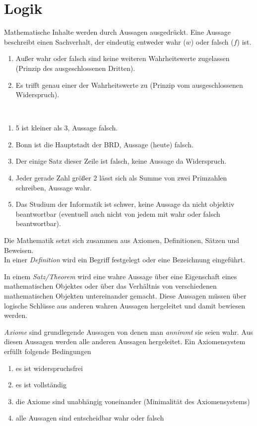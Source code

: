 \section{Logik}
Mathematische Inhalte werden durch Aussagen ausgedrückt. Eine Aussage beschreibt einen Sachverhalt, der eindeutig entweder wahr ($w$) oder falsch ($f$) ist.
\begin{enumerate}
\item Außer wahr oder falsch sind keine weiteren Wahrheitswerte zugelassen (Prinzip des ausgeschlossenen Dritten).
\item Es trifft genau einer der Wahrheitswerte zu (Prinzip vom ausgeschlossenen Widerspruch).
\end{enumerate}

\begin{example}~
\begin{enumerate}
\item 5 ist kleiner als 3, Aussage falsch.
\item Bonn ist die Hauptstadt der BRD, Aussage (heute) falsch.
\item Der einige Satz dieser Zeile ist falsch, keine Aussage da Widerspruch.
\item Jeder gerade Zahl größer 2 lässt sich als Summe von zwei Primzahlen schreiben, Aussage wahr.
\item Das Studium der Informatik ist schwer, keine Aussage da nicht objektiv beantwortbar (eventuell auch nicht von jedem mit wahr oder falsch beantwortbar).
\end{enumerate}
\end{example}

Die Mathematik setzt sich zusammen aus Axiomen, Definitionen, Sätzen und Beweisen.\\
In einer \emph{Definition} wird ein Begriff festgelegt oder eine Bezeichnung eingeführt.

In einem \emph{Satz/Theorem} wird eine wahre Aussage über eine Eigenschaft eines mathematischen Objektes oder über das Verhältnis von verschiedenen mathematischen Objekten untereinander gemacht. Diese Aussagen müssen über logische Schlüsse aus anderen wahren Aussagen hergeleitet und damit bewiesen werden.

\emph{Axiome} sind grundlegende Aussagen von denen man \emph{annimmt} sie seien wahr. Aus diesen Aussagen werden alle anderen Aussagen hergeleitet. Ein Axiomensystem erfüllt folgende Bedingungen
\begin{enumerate}
\item es ist widerspruchsfrei
\item es ist vollständig
\item die Axiome sind unabhängig voneinander (Minimalität des Axiomensystems)
\item alle Aussagen sind entscheidbar wahr oder falsch
\end{enumerate}

